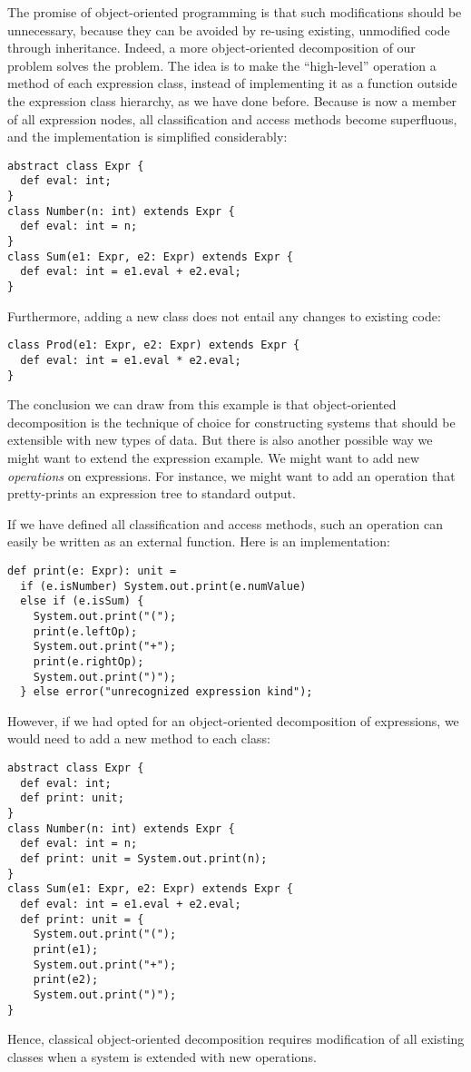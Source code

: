 \documentclass[11pt]{book}
\begin{document}
The promise of object-oriented programming is that such modifications
should be unnecessary, because they can be avoided by re-using
existing, unmodified code through inheritance. Indeed, a more
object-oriented decomposition of our problem solves the problem.  The
idea is to make the ``high-level'' operation \verb@eval@ a method of
each expression class, instead of implementing it as a function
outside the expression class hierarchy, as we have done
before. Because \verb@eval@ is now a member of all expression nodes,
all classification and access methods become superfluous, and the implementation is simplified considerably:
\begin{verbatim}
abstract class Expr {
  def eval: int;
}
class Number(n: int) extends Expr {
  def eval: int = n;
}
class Sum(e1: Expr, e2: Expr) extends Expr {
  def eval: int = e1.eval + e2.eval;
}
\end{verbatim}
Furthermore, adding a new \verb@Prod@ class does not entail any changes to existing code:
\begin{verbatim}
class Prod(e1: Expr, e2: Expr) extends Expr {
  def eval: int = e1.eval * e2.eval;
}
\end{verbatim}

The conclusion we can draw from this example is that object-oriented
decomposition is the technique of choice for constructing systems that
should be extensible with new types of data. But there is also another
possible way we might want to extend the expression example. We might
want to add new {\em operations} on expressions.  For instance, we might
want to add an operation that pretty-prints an expression tree to standard output.

If we have defined all classification and access methods, such an
operation can easily be written as an external function. Here is an
implementation:
\begin{verbatim}
def print(e: Expr): unit = 
  if (e.isNumber) System.out.print(e.numValue)
  else if (e.isSum) {
    System.out.print("("); 
    print(e.leftOp); 
    System.out.print("+");
    print(e.rightOp);
    System.out.print(")");
  } else error("unrecognized expression kind");
\end{verbatim}
However, if we had opted for an object-oriented decomposition of
expressions, we would need to add a new \verb@print@ method
to each class:
\begin{verbatim}
abstract class Expr {
  def eval: int;
  def print: unit;
}
class Number(n: int) extends Expr {
  def eval: int = n;
  def print: unit = System.out.print(n);
}
class Sum(e1: Expr, e2: Expr) extends Expr {
  def eval: int = e1.eval + e2.eval;
  def print: unit = {
    System.out.print("("); 
    print(e1); 
    System.out.print("+");
    print(e2);
    System.out.print(")");
}
\end{verbatim}
Hence, classical object-oriented decomposition requires modification
of all existing classes when a system is extended with new operations.
\end{document}
